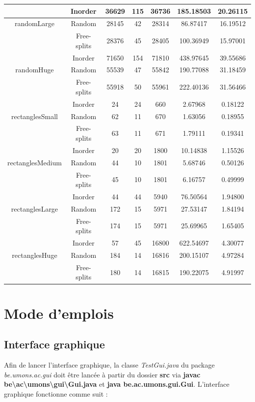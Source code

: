 \documentclass[11pt,a4paper]{article}
\theoremstyle{definition}
\theoremstyle{remark}
\begin{document}
\begin{table}
{\begin{tabular}{|c|c||c|c|c|c|c|}
\hline  
  & Inorder & 36629 & 115 & 36736 & 185.18503 & 20.26115 \\ 
\hline 
randomLarge & Random & 28145 & 42 & 28314 & 86.87417 & 16.19512 \\ 
\hline 
  & Free-splits & 28376 & 45 & 28405 & 100.36949 & 15.97001 \\ 
\hline
  & Inorder & 71650 & 154 & 71810 & 438.97645 & 39.55686 \\ 
\hline 
randomHuge & Random & 55539 & 47 & 55842 & 190.77088 & 31.18459 \\ 
\hline 
  & Free-splits & 55918 & 50 & 55961 & 222.40136 & 31.56466 \\ 
\hline
  & Inorder & 24 & 24 & 660 & 2.67968 & 0.18122 \\ 
\hline 
rectanglesSmall & Random & 62 & 11 & 670 & 1.63056 & 0.18955 \\ 
\hline 
  & Free-splits & 63 & 11 & 671 & 1.79111 & 0.19341 \\ 
\hline
  & Inorder & 20 & 20 & 1800 & 10.14838 & 1.15526 \\ 
\hline 
rectanglesMedium & Random & 44 & 10 & 1801 & 5.68746 & 0.50126 \\ 
\hline 
  & Free-splits & 45 & 10 & 1801 & 6.16757 & 0.49999 \\ 
\hline  
  & Inorder & 44 & 44 & 5940 & 76.50564 & 1.94800 \\ 
\hline 
rectanglesLarge & Random & 172 & 15 & 5971 & 27.53147 & 1.84194 \\ 
\hline 
  & Free-splits & 174 & 15 & 5971 & 25.69965 & 1.65405 \\ 
\hline
  & Inorder & 57 & 45 & 16800 & 622.54697 & 4.30077 \\ 
\hline 
rectanglesHuge & Random & 184 & 14 & 16816 & 200.15107 & 4.97284 \\ 
\hline 
  & Free-splits & 180 & 14 & 16815 & 190.22075 & 4.91997 \\ 
\hline
    
\end{tabular}%
}
\end{table}
\section{Mode d'emplois}

\subsection{Interface graphique}

Afin de lancer l'interface graphique, la classe \textit{TestGui.java} du package \textit{be.umons.ac.gui} doit être lancée à partir du dossier \textbf{src} via \textbf{javac be\textbackslash ac\textbackslash umons\textbackslash gui\textbackslash Gui.java} et \textbf{java be.ac.umons.gui.Gui}. L'interface graphique fonctionne comme suit : \\
\end{document}
